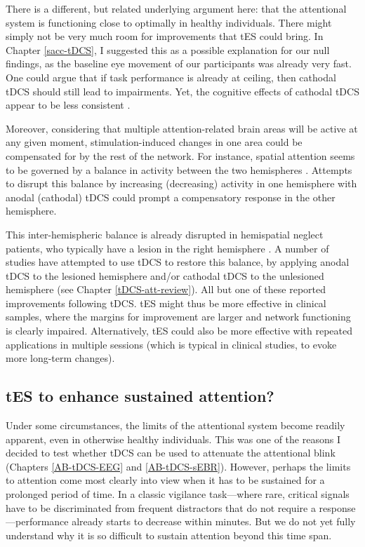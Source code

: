 \documentclass[11pt,]{memoir}
\begin{document}
There is a different, but related underlying argument here: that the attentional system is functioning close to optimally in healthy individuals. There might simply not be very much room for improvements that tES could bring. In Chapter \ref{sacc-tDCS}, I suggested this as a possible explanation for our null findings, as the baseline eye movement of our participants was already very fast. One could argue that if task performance is already at ceiling, then cathodal tDCS should still lead to impairments. Yet, the cognitive effects of cathodal tDCS appear to be less consistent \autocite{Jacobson2012}.

Moreover, considering that multiple attention-related brain areas will be active at any given moment, stimulation-induced changes in one area could be compensated for by the rest of the network. For instance, spatial attention seems to be governed by a balance in activity between the two hemispheres \autocite{Kinsbourne1970}. Attempts to disrupt this balance by increasing (decreasing) activity in one hemisphere with anodal (cathodal) tDCS could prompt a compensatory response in the other hemisphere.

This inter-hemispheric balance is already disrupted in hemispatial neglect patients, who typically have a lesion in the right hemisphere \autocite{Vallar1986}. A number of studies have attempted to use tDCS to restore this balance, by applying anodal tDCS to the lesioned hemisphere and/or cathodal tDCS to the unlesioned hemisphere (see Chapter \ref{tDCS-att-review}). All but one of these reported improvements following tDCS. tES might thus be more effective in clinical samples, where the margins for improvement are larger and network functioning is clearly impaired. Alternatively, tES could also be more effective with repeated applications in multiple sessions (which is typical in clinical studies, to evoke more long-term changes).

\hypertarget{tes-to-enhance-sustained-attention}{%
\subsection{tES to enhance sustained attention?}\label{tes-to-enhance-sustained-attention}}

Under some circumstances, the limits of the attentional system become readily apparent, even in otherwise healthy individuals. This was one of the reasons I decided to test whether tDCS can be used to attenuate the attentional blink (Chapters \ref{AB-tDCS-EEG} and \ref{AB-tDCS-sEBR}). However, perhaps the limits to attention come most clearly into view when it has to be sustained for a prolonged period of time. In a classic vigilance task---where rare, critical signals have to be discriminated from frequent distractors that do not require a response---performance already starts to decrease within minutes. But we do not yet fully understand why it is so difficult to sustain attention beyond this time span.
\end{document}

